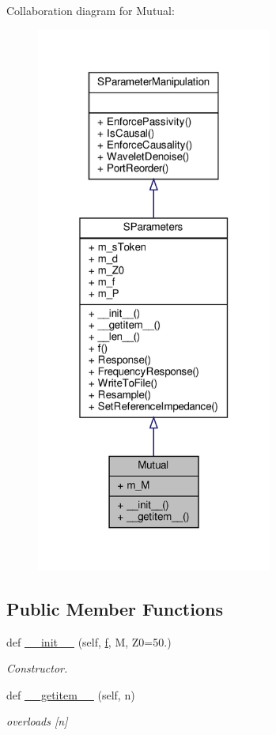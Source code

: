 Collaboration diagram for Mutual\+:
\nopagebreak
\begin{figure}[H]
\begin{center}
\leavevmode
\includegraphics[width=220pt]{classSignalIntegrity_1_1SParameters_1_1Devices_1_1Mutual_1_1Mutual__coll__graph}
\end{center}
\end{figure}
\subsection*{Public Member Functions}
\begin{DoxyCompactItemize}
\item 
def \hyperlink{classSignalIntegrity_1_1SParameters_1_1Devices_1_1Mutual_1_1Mutual_a0b54ec80fdef206b3b2bf17d77b083ee}{\+\_\+\+\_\+init\+\_\+\+\_\+} (self, \hyperlink{classSignalIntegrity_1_1SParameters_1_1SParameters_1_1SParameters_a32e7a34d6837fe949b413c852a0447f8}{f}, M, Z0=50.)
\begin{DoxyCompactList}\small\item\em Constructor. \end{DoxyCompactList}\item 
def \hyperlink{classSignalIntegrity_1_1SParameters_1_1Devices_1_1Mutual_1_1Mutual_ab7a6da5139e0878b590d68292aaa70f2}{\+\_\+\+\_\+getitem\+\_\+\+\_\+} (self, n)
\begin{DoxyCompactList}\small\item\em overloads \mbox{[}n\mbox{]} \end{DoxyCompactList}\end{DoxyCompactItemize}


